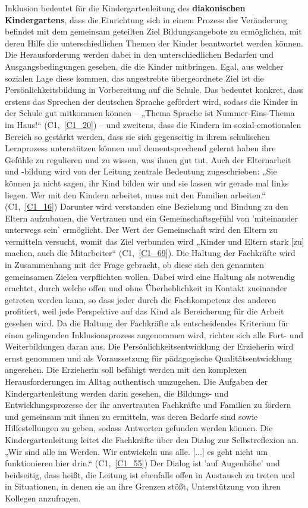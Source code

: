 Inklusion bedeutet für die Kindergartenleitung des \textbf{diakonischen Kindergartens}, dass die Einrichtung sich in einem Prozess der Veränderung befindet mit dem gemeinsam geteilten Ziel Bildungsangebote zu ermöglichen, mit deren Hilfe die unterschiedlichen Themen der Kinder beantwortet werden können. Die Herausforderung werden dabei in den unterschiedlichen Bedarfen und Ausgangsbedingungen gesehen, die die Kinder mitbringen. 
Egal, aus welcher sozialen Lage diese kommen, das angestrebte übergeordnete Ziel ist die Persönlichkeitsbildung in Vorbereitung auf die Schule. Das bedeutet konkret, dass erstens das Sprechen der deutschen Sprache gefördert wird, sodass die Kinder in der Schule gut mitkommen können -- „Thema Sprache ist Nummer-Eins-Thema im Haus!“ (C1,~\ref{C1_20}) -- und zweitens, dass die Kindern im sozial-emotionalen Bereich so gestärkt werden, dass sie sich gegenseitig in ihrem schulischen Lernprozess unterstützen können und dementsprechend gelernt haben ihre Gefühle zu regulieren und zu wissen, was ihnen gut tut. 
Auch der Elternarbeit und -bildung wird von der Leitung zentrale Bedeutung zugeschrieben: „Sie können ja nicht sagen, ihr Kind bilden wir und sie lassen wir gerade mal links liegen. Wer mit den Kindern arbeitet, muss mit den Familien arbeiten.“ (C1,~\ref{C1_16}) Darunter wird verstanden eine Beziehung und Bindung zu den Eltern aufzubauen, die Vertrauen und ein Gemeinschaftsgefühl von 'miteinander unterwegs sein' ermöglicht. Der Wert der Gemeinschaft wird den Eltern zu vermitteln versucht, womit das Ziel verbunden wird „Kinder und Eltern stark [zu] machen, auch die Mitarbeiter“ (C1,~\ref{C1_69}).
Die Haltung der Fachkräfte wird in Zusammenhang mit der Frage gebracht, ob diese sich den genannten gemeinsamen Zielen verpflichten wollen.
Dabei wird eine Haltung als notwendig erachtet, durch welche offen und ohne Überheblichkeit in Kontakt zueinander getreten werden kann, so dass jeder durch die Fachkompetenz des anderen profitiert, weil jede Perspektive auf das Kind als Bereicherung für die Arbeit gesehen wird.
Da die Haltung der Fachkräfte als entscheidendes Kriterium für einen gelingenden Inklusionsprozess angenommen wird, richten sich alle Fort- und Weiterbildungen daran aus. Die Persönlichkeitsentwicklung der Erzieherin wird ernst genommen und als Voraussetzung für pädagogische Qualitätsentwicklung angesehen. Die Erzieherin soll befähigt werden mit den komplexen Herausforderungen im Alltag authentisch umzugehen.
Die Aufgaben der Kindergartenleitung werden darin gesehen, die Bildungs- und Entwicklungsprozesse der ihr anvertrauten Fachkräfte und Familien zu fördern und gemeinsam mit ihnen zu ermitteln, was deren Bedarfe sind sowie Hilfestellungen zu geben, sodass Antworten gefunden werden können. Die Kindergartenleitung leitet die Fachkräfte über den Dialog zur Selbstreflexion an. „Wir sind alle im Werden. Wir entwickeln uns alle. [...] es geht nicht um funktionieren hier drin.“ (C1,~\ref{C1_55}) Der Dialog ist 'auf Augenhöhe' und beidseitig, dass heißt, die Leitung ist ebenfalls offen in Austausch zu treten und in Situationen, in denen sie an ihre Grenzen stößt, Unterstützung von ihren Kollegen anzufragen. 
